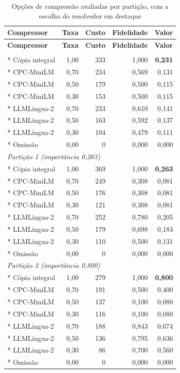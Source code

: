 {
\footnotesize
\setlength{\tabcolsep}{6pt}
\begin{longtable}{lrrrr}
\caption{Opções de compressão avaliadas por partição, com a escolha do resolvedor em destaque}
\label{tab:exemplo-opcoes} \\
\toprule
\textbf{Compressor} & \textbf{Taxa} & \textbf{Custo} & \textbf{Fidelidade} & \textbf{Valor} \\
\midrule
\endfirsthead
\toprule
\textbf{Compressor} & \textbf{Taxa} & \textbf{Custo} & \textbf{Fidelidade} & \textbf{Valor} \\
\midrule
\endhead
\bottomrule
\endfoot
\bottomrule
\endlastfoot
\multicolumn{5}{l}{\textit{Partição 0 (importância 0,231)}} \\*
Cópia integral & 1,00 & 333 & 1,000 & \textbf{0,231} \\*
CPC-MiniLM     & 0,70 & 234 & 0,569 & 0,131 \\*
CPC-MiniLM     & 0,50 & 179 & 0,500 & 0,115 \\*
CPC-MiniLM     & 0,30 & 153 & 0,500 & 0,115 \\*
LLMLingua-2    & 0,70 & 233 & 0,610 & 0,141 \\*
LLMLingua-2    & 0,50 & 163 & 0,592 & 0,137 \\*
LLMLingua-2    & 0,30 & 104 & 0,479 & 0,111 \\*
Omissão        & 0,00 & 0   & 0,000 & 0,000 \\
\midrule
\multicolumn{5}{l}{\textit{Partição 1 (importância 0,263)}} \\*
Cópia integral & 1,00 & 369 & 1,000 & \textbf{0,263} \\*
CPC-MiniLM     & 0,70 & 249 & 0,308 & 0,081 \\*
CPC-MiniLM     & 0,50 & 176 & 0,308 & 0,081 \\*
CPC-MiniLM     & 0,30 & 121 & 0,308 & 0,081 \\*
LLMLingua-2    & 0,70 & 252 & 0,780 & 0,205 \\*
LLMLingua-2    & 0,50 & 179 & 0,698 & 0,183 \\*
LLMLingua-2    & 0,30 & 110 & 0,500 & 0,131 \\*
Omissão        & 0,00 & 0   & 0,000 & 0,000 \\
\midrule
\multicolumn{5}{l}{\textit{Partição 2 (importância 0,800)}} \\*
Cópia integral & 1,00 & 279 & 1,000 & \textbf{0,800} \\*
CPC-MiniLM     & 0,70 & 191 & 0,500 & 0,400 \\*
CPC-MiniLM     & 0,50 & 137 & 0,100 & 0,080 \\*
CPC-MiniLM     & 0,30 & 116 & 0,100 & 0,080 \\*
LLMLingua-2    & 0,70 & 188 & 0,843 & 0,674 \\*
LLMLingua-2    & 0,50 & 136 & 0,795 & 0,636 \\*
LLMLingua-2    & 0,30 & 86  & 0,700 & 0,560 \\*
Omissão        & 0,00 & 0   & 0,000 & 0,000 \\
\end{longtable}
}


